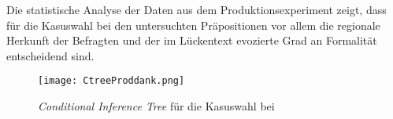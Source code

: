 Die statistische Analyse der Daten aus dem Produktionsexperiment zeigt, dass für die Kasuswahl bei den untersuchten Präpositionen vor allem die regionale Herkunft der Befragten und der im Lückentext evozierte Grad an Formalität entscheidend sind. 
\begin{figure}
\centering
\texttt{[image: CtreeProddank.png]}
\caption{\textit{Conditional Inference Tree} für die Kasuswahl bei \dank}
\label{pic:CtreeProdDank}
\end{figure}
%
